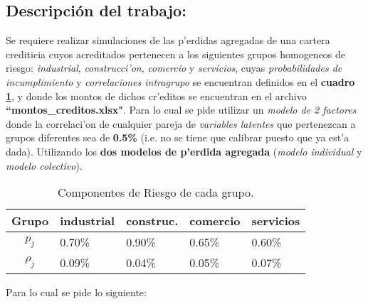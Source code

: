 \documentclass[10pt, oneside]{article}
\begin{document}
\subsection*{Descripci\'on del trabajo:}

\noindent
Se requiere realizar simulaciones de las p'erdidas agregadas de una cartera crediticia cuyos acreditados pertenecen a los siguientes grupos homogeneos de riesgo: \emph{industrial}, \emph{construcci'on}, \emph{comercio} y \emph{servicios}, cuyas \emph{probabilidades de incumplimiento} y \emph{correlaciones intragrupo} se encuentran definidos en el \textbf{cuadro \ref{tabla1}}, y donde los montos de dichos cr'editos se encuentran en el archivo \textbf{``montos\_creditos.xlsx"}. Para lo cual se pide utilizar un \emph{modelo de 2 factores} donde la correlaci'on de cualquier pareja de \emph{variables latentes} que pertenezcan a grupos diferentes sea de \textbf{0.5\%} (i.e. no se tiene que calibrar puesto que ya est'a dada). Utilizando los \textbf{dos modelos de p'erdida agregada} (\emph{modelo individual} y \emph{modelo colectivo}).\\

\begin{table}[h]
\begin{center}
\begin{tabular}{|c|l|l|l|l|}
\hline

{Grupo} & 	{\bf industrial} 	&    {\bf construc.}	 &   {\bf comercio} 	& {\bf servicios}\\
\hline
\hline
         $p_j$ & 0.70\%	& 0.90\%	& 0.65\%	& 0.60\%\\
\hline
         $\rho_j$ & 0.09\%	& 0.04\%	& 0.05\%	& 0.07\%\\
\hline
\end{tabular}
\caption{Componentes de Riesgo de cada grupo.}\label{tabla1}
\end{center}
\end{table}

\noindent
Para lo cual se pide lo siguiente:
\end{document}

